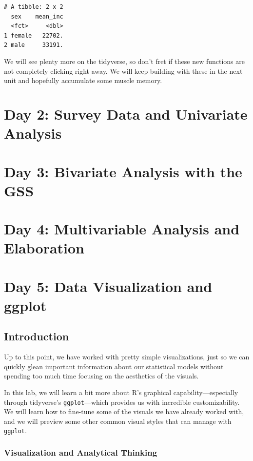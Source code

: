 \documentclass[
  letterpaper,
  DIV=11,
  numbers=noendperiod]{scrreprt}
\begin{document}
\begin{verbatim}
# A tibble: 2 x 2
  sex    mean_inc
  <fct>     <dbl>
1 female   22702.
2 male     33191.
\end{verbatim}

We will see plenty more on the tidyverse, so don't fret if these new
functions are not completely clicking right away. We will keep building
with these in the next unit and hopefully accumulate some muscle memory.

\part{Day 2: Survey Data and Univariate Analysis}

\part{Day 3: Bivariate Analysis with the GSS}

\part{Day 4: Multivariable Analysis and Elaboration}

\part{Day 5: Data Visualization and ggplot}

\chapter*{Introduction}\label{introduction}


Up to this point, we have worked with pretty simple visualizations, just
so we can quickly glean important information about our statistical
models without spending too much time focusing on the aesthetics of the
visuals.

In this lab, we will learn a bit more about R's graphical
capability---especially through tidyverse's \texttt{ggplot}---which
provides us with incredible customizability. We will learn how to
fine-tune some of the visuals we have already worked with, and we will
preview some other common visual styles that can manage with
\texttt{ggplot}.

\section*{Visualization and Analytical
Thinking}\label{visualization-and-analytical-thinking}
\end{document}
